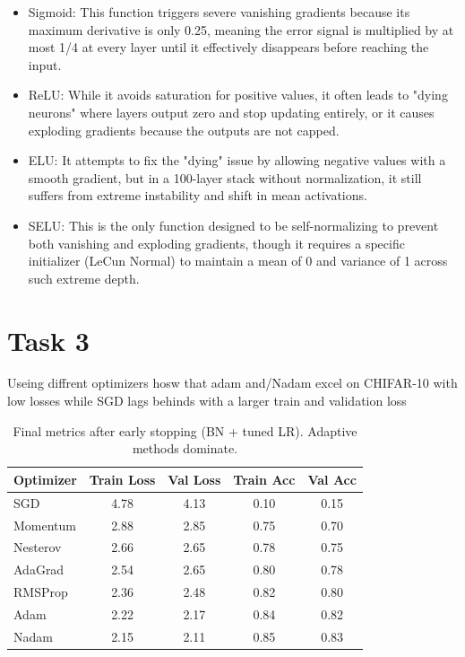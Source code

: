 \documentclass[conference, twocolum]{IEEEtran}
\begin{document}
\begin{itemize}
    \item Sigmoid: This function triggers severe vanishing gradients because its maximum derivative is only 0.25, meaning the error signal is multiplied by at most 1/4 at every layer until it effectively disappears before reaching the input.
\item ReLU: While it avoids saturation for positive values, it often leads to "dying neurons" where layers output zero and stop updating entirely, or it causes exploding gradients because the outputs are not capped.

\item ELU: It attempts to fix the "dying" issue by allowing negative values with a smooth gradient, but in a 100-layer stack without normalization, it still suffers from extreme instability and shift in mean activations.

\item SELU: This is the only function designed to be self-normalizing to prevent both vanishing and exploding gradients, though it requires a specific initializer (LeCun Normal) to maintain a mean of 0 and variance of 1 across such extreme depth.
\end{itemize}

\vspace{1em}

\section{Task 3}
Useing diffrent optimizers hosw that adam and/Nadam excel on CHIFAR-10 with low losses while SGD lags behinds with a larger train and validation loss

\begin{table}[H]
\centering
\begin{tabular}{lcccc}
\toprule
Optimizer & Train Loss & Val Loss & Train Acc & Val Acc \\
\midrule
SGD & 4.78 & 4.13 & 0.10 & 0.15 \\
Momentum & 2.88 & 2.85 & 0.75 & 0.70 \\
Nesterov & 2.66 & 2.65 & 0.78 & 0.75 \\
AdaGrad & 2.54 & 2.65 & 0.80 & 0.78 \\
RMSProp & 2.36 & 2.48 & 0.82 & 0.80 \\
Adam & 2.22 & 2.17 & 0.84 & 0.82 \\
Nadam & 2.15 & 2.11 & 0.85 & 0.83 \\
\bottomrule
\end{tabular}
\caption{Final metrics after early stopping (BN + tuned LR). Adaptive methods dominate.}
\label{tab:optimizers}
\end{table}
\end{document}
